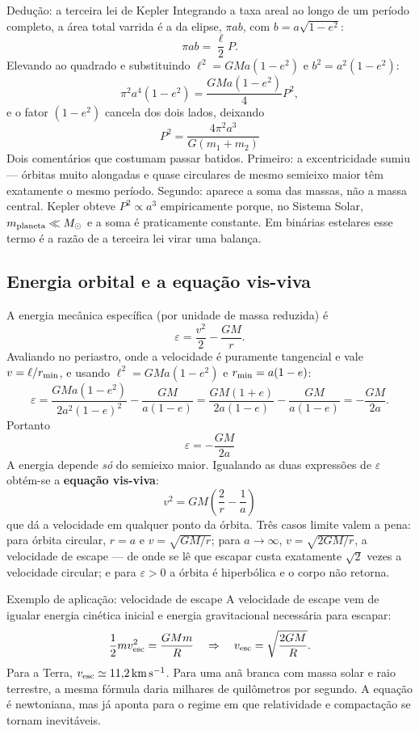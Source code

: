 \documentclass[11pt,a4paper]{article}
\begin{document}
\begin{lessonblock}[borderline west={2pt}{0pt}{astroGold}]{Dedução: a terceira lei de Kepler}
Integrando a taxa areal ao longo de um período completo, a área total varrida é a da elipse, $\pi ab$, com $b=a\sqrt{1-e^{2}}$:
\[
\pi a b=\frac{\ell}{2}P.
\]
Elevando ao quadrado e substituindo $\ell^{2}=GMa(1-e^{2})$ e $b^{2}=a^{2}(1-e^{2})$:
\[
\pi^{2}a^{4}(1-e^{2})=\frac{GMa(1-e^{2})}{4}P^{2},
\]
e o fator $(1-e^{2})$ cancela dos dois lados, deixando
\[
\boxed{\ P^{2}=\frac{4\pi^{2}a^{3}}{G(m_1+m_2)}\ }
\]
Dois comentários que costumam passar batidos. Primeiro: a excentricidade sumiu --- órbitas muito alongadas e quase circulares de mesmo semieixo maior têm exatamente o mesmo período. Segundo: aparece a soma das massas, não a massa central. Kepler obteve $P^2\propto a^3$ empiricamente porque, no Sistema Solar, $m_{\rm planeta}\ll M_\odot$ e a soma é praticamente constante. Em binárias estelares esse termo é a razão de a terceira lei virar uma balança.
\end{lessonblock}

\subsection*{Energia orbital e a equação vis-viva}

A energia mecânica específica (por unidade de massa reduzida) é
\[
\varepsilon=\frac{v^{2}}{2}-\frac{GM}{r}.
\]
Avaliando no periastro, onde a velocidade é puramente tangencial e vale $v=\ell/r_{\rm min}$, e usando $\ell^2=GMa(1-e^2)$ e $r_{\rm min}=a(1-e)$:
\[
\varepsilon=\frac{GMa(1-e^{2})}{2a^{2}(1-e)^{2}}-\frac{GM}{a(1-e)}
=\frac{GM(1+e)}{2a(1-e)}-\frac{GM}{a(1-e)}
=-\frac{GM}{2a}.
\]
Portanto
\[
\boxed{\ \varepsilon=-\frac{GM}{2a}\ }
\]
A energia depende \emph{só} do semieixo maior. Igualando as duas expressões de $\varepsilon$ obtém-se a \textbf{equação vis-viva}:
\[
\boxed{\ v^{2}=GM\left(\frac{2}{r}-\frac{1}{a}\right)\ }
\]
que dá a velocidade em qualquer ponto da órbita. Três casos limite valem a pena: para órbita circular, $r=a$ e $v=\sqrt{GM/r}$; para $a\to\infty$, $v=\sqrt{2GM/r}$, a velocidade de escape --- de onde se lê que escapar custa exatamente $\sqrt{2}$ vezes a velocidade circular; e para $\varepsilon>0$ a órbita é hiperbólica e o corpo não retorna.

\begin{lessonblock}{Exemplo de aplicação: velocidade de escape}
A velocidade de escape vem de igualar energia cinética inicial e energia gravitacional necessária para escapar:
\[
\frac{1}{2}mv_{\rm esc}^2=\frac{GMm}{R}
\quad\Rightarrow\quad
v_{\rm esc}=\sqrt{\frac{2GM}{R}}.
\]
Para a Terra, $v_{\rm esc}\simeq11{,}2\,\mathrm{km\,s^{-1}}$. Para uma anã branca com massa solar e raio terrestre, a mesma fórmula daria milhares de quilômetros por segundo. A equação é newtoniana, mas já aponta para o regime em que relatividade e compactação se tornam inevitáveis.
\end{lessonblock}
\end{document}
